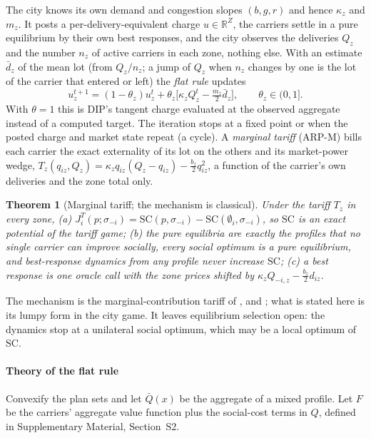 \documentclass[preprint,11pt]{elsarticle}
\newtheorem{theorem}{Theorem}
\theoremstyle{definition}
\theoremstyle{remark}
\newcommand{\R}{\mathbb{R}}
\newcommand{\SM}[1]{Supplementary Material, Section~#1}
\begin{document}
The city knows its own demand and congestion slopes $(b,g,r)$ and hence $\kappa_z$ and $m_z$. It posts a per-delivery-equivalent charge $u\in\R^Z$, the carriers settle in a pure equilibrium by their own best responses, and the city observes the deliveries $Q_z$ and the number $n_z$ of active carriers in each zone, nothing else. With an estimate $\bar d_z$ of the mean lot (from $Q_z/n_z$; a jump of $Q_z$ when $n_z$ changes by one is the lot of the carrier that entered or left) the \emph{flat rule} updates
\begin{equation}\label{eq:rule}
u^{t+1}_z=(1-\theta_z)u^t_z+\theta_z\big[\kappa_zQ^t_z-\tfrac{m_z}{2}\bar d_z\big],\qquad\theta_z\in(0,1].
\end{equation}
With $\theta=1$ this is DIP's tangent charge evaluated at the observed aggregate instead of a computed target. The iteration stops at a fixed point or when the posted charge and market state repeat (a cycle). A \emph{marginal tariff} (ARP-M) bills each carrier the exact externality of its lot on the others and its market-power wedge, $T_z(q_{iz},Q_z)=\kappa_zq_{iz}(Q_z-q_{iz})-\tfrac{b_z}{2}q_{iz}^2$, a function of the carrier's own deliveries and the zone total only.

\begin{theorem}[Marginal tariff; the mechanism is classical]\label{thm:mct}
Under the tariff $T_z$ in every zone, (a) $J^T_i(p;\sigma_{-i})=\mathrm{SC}(p,\sigma_{-i})-\mathrm{SC}(\emptyset_i,\sigma_{-i})$, so $\mathrm{SC}$ is an exact potential of the tariff game; (b) the pure equilibria are exactly the profiles that no single carrier can improve socially, every social optimum is a pure equilibrium, and best-response dynamics from any profile never increase $\mathrm{SC}$; (c) a best response is one oracle call with the zone prices shifted by $\kappa_zQ_{-i,z}-\tfrac{b_z}{2}d_{iz}$.
\end{theorem}
The mechanism is the marginal-contribution tariff of \citet{Wolpert2001}, \citet{Sandholm2002} and \citet{Marden2013}; what is stated here is its lumpy form in the city game. It leaves equilibrium selection open: the dynamics stop at a unilateral social optimum, which may be a local optimum of $\mathrm{SC}$.

\paragraph{Theory of the flat rule} Convexify the plan sets and let $\bar Q(x)$ be the aggregate of a mixed profile. Let $F$ be the carriers' aggregate value function plus the social-cost terms in $Q$, defined in \SM{S2}.
\end{document}
